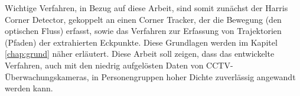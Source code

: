 Wichtige Verfahren, in Bezug auf diese Arbeit, sind somit zunächst der Harris Corner Detector, gekoppelt an einen Corner Tracker, der die Bewegung (den optischen Fluss) erfasst, sowie das Verfahren zur Erfassung von Trajektorien (Pfaden) der extrahierten Eckpunkte. Diese Grundlagen werden im Kapitel \ref{chap:grund} näher erläutert. Diese Arbeit soll zeigen, dass das entwickelte Verfahren, auch mit den niedrig aufgelösten Daten \zb von CCTV-Überwachungskameras, in Personengruppen hoher Dichte zuverlässig angewandt werden kann.



